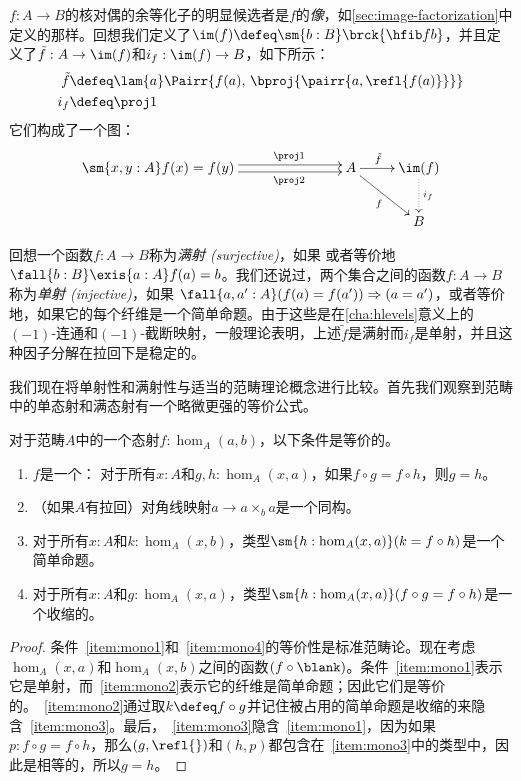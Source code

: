 %
%
$f:A\to B$的核对偶的余等化子的明显候选者是$f$的\emph{像}，如\cref{sec:image-factorization}中定义的那样。回想我们定义了$\im(f)\defeq \sm{b:B} \brck{\hfib f b}$，并且定义了$\tilde{f}:A\to\im(f)$和$i_f:\im(f)\to B$，如下所示：
\begin{align*}
  \tilde{f} & \defeq \lam{a} \Pairr{f(a),\,\bproj{\pairr{a,\refl{f(a)}}}}\\
  i_f & \defeq \proj1
\end{align*}
它们构成了一个图：
\begin{equation*}
  \xymatrix{
    **[l]{\sm{x,y:A} f(x)= f(y)}
    \ar@<0.25em>[r]^{\proj1}
    \ar@<-0.25em>[r]_{\proj2}
    &
      {A}
    \ar[r]^(0.4){\tilde{f}}
    \ar[rd]_{f}
    &
      {\im(f)}
    \ar@{..>}[d]^{i_f}
    \\ & &
    B
  }
\end{equation*}

回想一个函数$f:A\to B$称为\emph{满射 (surjective)}，如果
%
或者等价地$\fall{b:B} \exis{a:A} f(a)=b$。我们还说过，两个集合之间的函数$f:A\to B$称为\emph{单射 (injective)}，如果
%
$\fall{a,a':A} (f(a) = f(a')) \Rightarrow (a=a')$，或者等价地，如果它的每个纤维是一个简单命题。由于这些是在\cref{cha:hlevels}意义上的$(-1)$-连通和$(-1)$-截断映射，一般理论表明，上述$\tilde f$是满射而$i_f$是单射，并且这种因子分解在拉回下是稳定的。

我们现在将单射性和满射性与适当的范畴理论概念进行比较。首先我们观察到范畴中的单态射和满态射有一个略微更强的等价公式。

\begin{lem}\label{thm:mono}
对于范畴$A$中的一个态射$f:\hom_A(a,b)$，以下条件是等价的。
\begin{enumerate}
  \item $f$是一个：
  对于所有$x:A$和${g,h:\hom_A(x,a)}$，如果$f\circ g = f\circ h$，则$g=h$。\label{item:mono1}
  \item （如果$A$有拉回）对角线映射$a\to a\times_b a$是一个同构。\label{item:mono4}
  \item 对于所有$x:A$和$k:\hom_A(x,b)$，类型$\sm{h:\hom_A(x,a)} (k = f\circ h)$是一个简单命题。\label{item:mono2}
  \item 对于所有$x:A$和${g:\hom_A(x,a)}$，类型$\sm{h:\hom_A(x,a)} (f\circ g = f\circ h)$是一个收缩的。\label{item:mono3}
\end{enumerate}
\end{lem}
\begin{proof}
  条件~\ref{item:mono1}和~\ref{item:mono4}的等价性是标准范畴论。现在考虑$\hom_A(x,a)$和$\hom_A(x,b)$之间的函数$(f\circ \blank )$。条件~\ref{item:mono1}表示它是单射，而~\ref{item:mono2}表示它的纤维是简单命题；因此它们是等价的。~\ref{item:mono2}通过取$k\defeq f\circ g$并记住被占用的简单命题是收缩的来隐含~\ref{item:mono3}。最后，~\ref{item:mono3}隐含~\ref{item:mono1}，因为如果$p:f\circ g= f\circ h$，那么$(g,\refl{})$和$(h,p)$都包含在~\ref{item:mono3}中的类型中，因此是相等的，所以$g=h$。
\end{proof}

